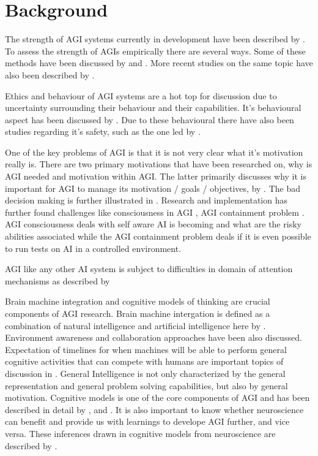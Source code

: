 \documentclass{article}
\begin{document}
\section{Background}
\label{sec:headings}


The strength of AGI systems currently in development have been described by \citet{nikolay2020strength}. To assess the strength of AGIs empirically there are several ways. Some of these methods have been discussed by \citet{wang2010evaluation} and \citet{solo2010complexity}. More recent studies on the same topic have also been described by \citet{bowen2020evaluation}.

Ethics and behaviour of AGI systems are a hot top for discussion due to uncertainty surrounding their behaviour and their capabilities. It's behavioural aspect has been discussed by \citet{hibbard2012aibehvaiour}. Due to these behavioural there have also been studies regarding it's safety, such as the one led by \citet{aliman2019safety}.

One of the key problems of AGI is that it is not very clear what it's motivation really is. There are two primary motivations that have been researched on, why is AGI needed and motivation within AGI. The latter primarily discusses why it is important for AGI to manage its motivation / goals / objectives, by \citet{pei2012motivationmanagement}. The bad decision making is further illustrated in \citet{casper2020problems}.
Research and implementation has further found challenges like consciousness in AGI \citet{boltuc2020consciousness}, AGI containment problem \citet{james2016containment}. AGI consciousness deals with self aware AI is becoming and what are the risky abilities associated while the AGI containment problem deals if it is even possible to run tests on AI in a controlled environment.

AGI like any other AI system is subject to difficulties in domain of attention mechanisms as described by \citet{orseau2012issues}

Brain machine integration and cognitive models of thinking are crucial components of AGI research. Brain machine intergation is defined as a combination of natural intelligence and artificial intelligence here by \citet{shi2019cognitive}. Environment awareness and collaboration approaches have been also discussed. Expectation of timelines for when machines will be able to perform general cognitive activities that can compete with humans are important topics of discussion in \citet{SIEMENS2022100107}. General Intelligence is not only characterized by the general representation and general problem solving capabilities, but also by general motivation. Cognitive models is one of the core components of AGI and has been described in detail by , \citet{levy2014cognitive} and \citet{bach2011cognitive}. It is also important to know whether neuroscience can benefit and provide us with learnings to develope AGI further, and vice versa. These inferences drawn in cognitive models from neuroscience are described by \citet{koene2011neuroscience}.
\end{document}
